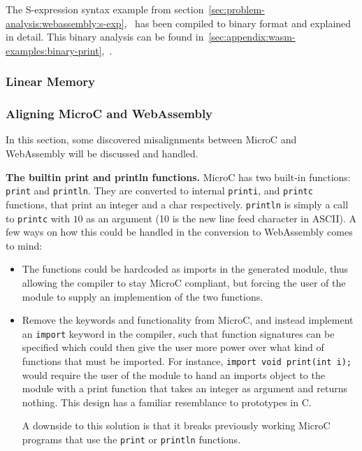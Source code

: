\documentclass[a4paper]{article}
\begin{document}
The S-expression syntax example from section~\ref{sec:problem-analysis:webassembly:s-exp},~ has been compiled to binary format and explained in detail. This binary analysis can be found in~\ref{sec:appendix:wasm-examples:binary-print},~.

\subsubsection{Linear Memory}
\label{sec:problem-analysis-webassembly:linear-memory}

\subsubsection{Aligning MicroC and WebAssembly}
\label{sec:problem-analysis-webassembly:aligning}
In this section, some discovered misalignments between MicroC and WebAssembly will be discussed and handled.

\noindent \textbf{The builtin print and println functions.} MicroC has two built-in functions: \texttt{print} and \texttt{println}. They are converted to internal \texttt{printi}, and \texttt{printc} functions, that print an integer and a char respectively. \texttt{println} is simply a call to \texttt{printc} with $10$ as an argument (10 is the new line feed character in ASCII). A few ways on how this could be handled in the conversion to WebAssembly comes to mind:
\begin{itemize}
	\item The functions could be hardcoded as imports in the generated module, thus allowing the compiler to stay MicroC compliant, but forcing the user of the module to supply an implemention of the two functions.
	\item Remove the keywords and functionality from MicroC, and instead implement an \texttt{import} keyword in the compiler, such that function signatures can be specified which could then give the user more power over what kind of functions that must be imported. For instance, \texttt{import void print(int i);} would require the user of the module to hand an imports object to the module with a print function that takes an integer as argument and returns nothing. This design has a familiar resemblance to prototypes in C.

	A downside to this solution is that it breaks previously working MicroC programs that use the \texttt{print} or \texttt{println} functions.
\end{itemize}
\end{document}
